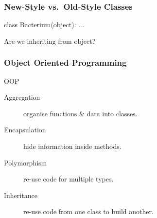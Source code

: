 \begin{frame}[fragile]
\frametitle{New-Style vs.\ Old-Style Classes}
\begin{python}
class Bacterium(object):
    ...
\end{python}

Are we inheriting from \alert{object}?
\end{frame}


\begin{frame}[fragile] 
\frametitle{Object Oriented Programming}

\begin{block}{OOP}
\begin{description}
\item[\alert{Aggregation}] organise functions \& data into classes.
\item[\alert{Encapsulation}] hide information inside methods.
\item[\alert{Polymorphism}] re-use code for multiple types.
\item[\alert{Inheritance}] re-use code from one class to build another.
\end{description}
\end{block}
\end{frame}


